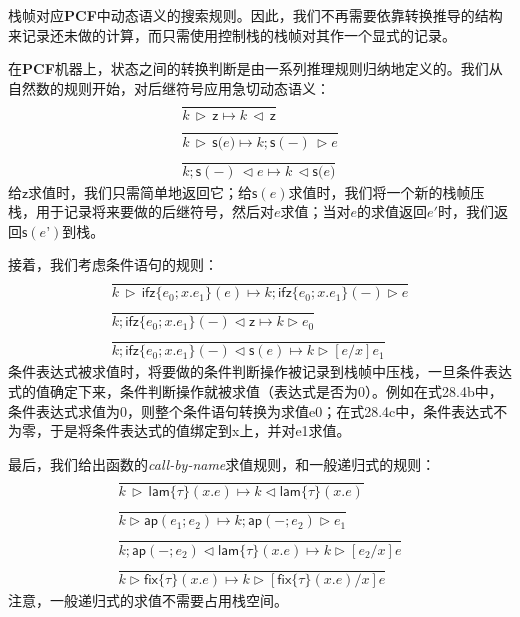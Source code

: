 栈帧对应\textbf{PCF}中动态语义的搜索规则。因此，我们不再需要依靠转换推导的结构来记录还未做的计算，而只需使用控制栈的栈帧对其作一个显式的记录。

在\textbf{PCF}机器上，状态之间的转换判断是由一系列推理规则归纳地定义的。我们从自然数的规则开始，对后继符号应用急切动态语义：
\begin{subequations}
    \begin{gather}
       \dfrac{}{k \, \triangleright \, \mathsf{z} \longmapsto k \, \triangleleft \, \mathsf{z}}\\
       \dfrac{}{k \, \triangleright \, \mathsf{s(} e \mathsf{)} \longmapsto k; \mathsf{s(-)} \, \triangleright e}\\
       \dfrac{}{k; \mathsf{s(-)} \, \triangleleft e \longmapsto k\, \triangleleft \mathsf{s(} e \mathsf{)}}
    \end{gather}
\end{subequations}
给$\mathsf{z}$求值时，我们只需简单地返回它；给$\mathsf{s} (e)$求值时，我们将一个新的栈帧压栈，用于记录将来要做的后继符号，然后对$e$求值；当对$e$的求值返回$e'$时，我们返回$\mathsf{s} (e’)$到栈。

接着，我们考虑条件语句的规则：
\begin{subequations}
    \begin{gather}
       \dfrac{}{k \, \triangleright \, \mathsf{ifz} \{ e_0;x.e_1 \} (e) \longmapsto k; \mathsf{ifz} \{ e_0;x.e_1 \} (-) \triangleright e}\\
       \dfrac{}{k; \mathsf{ifz} \{ e_0;x.e_1 \} (-) \triangleleft \mathsf{z} \longmapsto k \triangleright e_0}\\
       \dfrac{}{k; \mathsf{ifz} \{ e_0;x.e_1 \} (-) \triangleleft \mathsf{s} (e) \longmapsto k \triangleright [e/x]e_1}
    \end{gather}
\end{subequations}
条件表达式被求值时，将要做的条件判断操作被记录到栈帧中压栈，一旦条件表达式的值确定下来，条件判断操作就被求值（表达式是否为0）。例如在式28.4b中，条件表达式求值为0，则整个条件语句转换为求值e0；在式28.4c中，条件表达式不为零，于是将条件表达式的值绑定到x上，并对e1求值。

最后，我们给出函数的\textit{call-by-name}求值规则，和一般递归式的规则：
\begin{subequations}
    \begin{gather}
       \dfrac{}{k \, \triangleright \, \mathsf{lam} \{ \tau \} (x.e) \longmapsto k \triangleleft \mathsf{lam} \{ \tau \} (x.e)}\\
       \dfrac{}{k \triangleright \mathsf{ap} (e_1;e_2) \longmapsto k; \mathsf{ap} (-;e_2) \triangleright e_1 }\\
       \dfrac{}{k; \mathsf{ap} (-;e_2) \triangleleft \mathsf{lam} \{ \tau \} (x.e) \longmapsto k \triangleright [e_2/x]e }\\
       \dfrac{}{k \triangleright \mathsf{fix} \{ \tau \} (x.e) \longmapsto k \triangleright [ \mathsf{fix} \{ \tau \} (x.e)/x]e}
    \end{gather}
\end{subequations}
注意，一般递归式的求值不需要占用栈空间。

